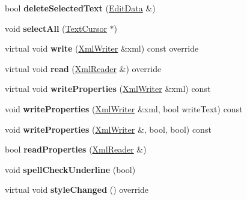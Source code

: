 \begin{DoxyCompactItemize}
bool {\bfseries delete\+Selected\+Text} (\hyperlink{class_ms_1_1_edit_data}{Edit\+Data} \&)
\item 
\mbox{\label{class_ms_1_1_text_a27b683e1fd31b88a8000661db56bc2f0}} 
void {\bfseries select\+All} (\hyperlink{class_ms_1_1_text_cursor}{Text\+Cursor} $\ast$)
\item 
\mbox{\label{class_ms_1_1_text_a503f2d9f1f42721ed3b88f2e1f00b0d9}} 
virtual void {\bfseries write} (\hyperlink{class_ms_1_1_xml_writer}{Xml\+Writer} \&xml) const override
\item 
\mbox{\label{class_ms_1_1_text_a6e449865b70b6d7afb483c49fdb1cf3b}} 
virtual void {\bfseries read} (\hyperlink{class_ms_1_1_xml_reader}{Xml\+Reader} \&) override
\item 
\mbox{\label{class_ms_1_1_text_af58d3c1218bbc9c4be24a56fee56d94a}} 
virtual void {\bfseries write\+Properties} (\hyperlink{class_ms_1_1_xml_writer}{Xml\+Writer} \&xml) const
\item 
\mbox{\label{class_ms_1_1_text_a8b3bf2cb46dc9992c020e3feab243117}} 
void {\bfseries write\+Properties} (\hyperlink{class_ms_1_1_xml_writer}{Xml\+Writer} \&xml, bool write\+Text) const
\item 
\mbox{\label{class_ms_1_1_text_a3107cdfbe52de975b2830204c6ab4549}} 
void {\bfseries write\+Properties} (\hyperlink{class_ms_1_1_xml_writer}{Xml\+Writer} \&, bool, bool) const
\item 
\mbox{\label{class_ms_1_1_text_ac72d952c4a681ee8cd064e7a9325cb4b}} 
bool {\bfseries read\+Properties} (\hyperlink{class_ms_1_1_xml_reader}{Xml\+Reader} \&)
\item 
\mbox{\label{class_ms_1_1_text_a92e868c5d6398aea32a291456e7aba2e}} 
void {\bfseries spell\+Check\+Underline} (bool)
\item 
\mbox{\label{class_ms_1_1_text_a37cf72ba8bf53d98ec0516fb81317653}} 
virtual void {\bfseries style\+Changed} () override
\item 
\mbox{\label{class_ms_1_1_text_a113f26e7b7bc9224687f76b58f5b9263}} 

\end{DoxyCompactItemize}
